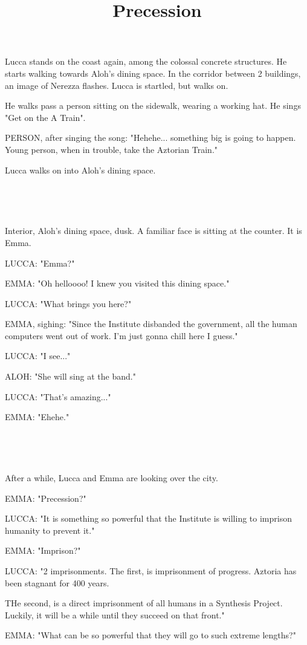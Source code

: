 \documentclass[11pt]{article}
\begin{document}
\ttfamily
\title{Precession}
\maketitle

Lucca stands on the coast again, among the colossal concrete structures.
He starts walking towards Aloh's dining space.
In the corridor between 2 buildings, an image of Nerezza flashes.
Lucca is startled, but walks on.

He walks pass a person sitting on the sidewalk, wearing a working hat.
He sings "Get on the A Train".

PERSON, after singing the song: "Hehehe... something big is going to happen.
Young person, when in trouble, take the Aztorian Train."

Lucca walks on into Aloh's dining space. 

\ 

\ 

Interior, Aloh's dining space, dusk. 
A familiar face is sitting at the counter.
It is Emma.

LUCCA: "Emma?"

EMMA: "Oh helloooo!
I knew you visited this dining space."

LUCCA: "What brings you here?"

EMMA, sighing: "Since the Institute disbanded the government, all the human computers went out of work.
I'm just gonna chill here I guess."

LUCCA: "I see..."

ALOH: "She will sing at the band."

LUCCA: "That's amazing..."

EMMA: "Ehehe."

\ 

\ 

After a while, Lucca and Emma are looking over the city.

EMMA: "Precession?"

LUCCA: "It is something so powerful that the Institute is willing to imprison humanity to prevent it."

EMMA: "Imprison?"

LUCCA: "2 imprisonments.
The first, is imprisonment of progress.
Aztoria has been stagnant for 400 years.

THe second, is a direct imprisonment of all humans in a Synthesis Project.
Luckily, it will be a while until they succeed on that front."

EMMA: "What can be so powerful that they will go to such extreme lengths?"
\end{document}
